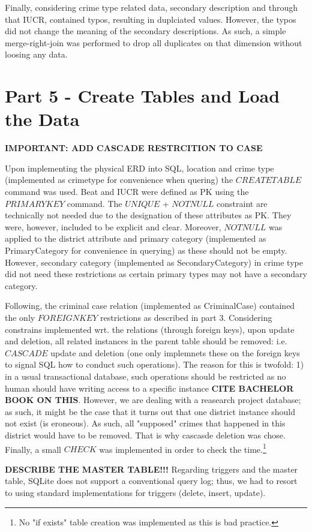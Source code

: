 \documentclass[a4paper]{article}
\begin{document}
Finally, considering crime type related data, secondary description and through that IUCR, contained typos, resulting in duplciated values. However, the typos did not change the meaning of the secondary descriptions. As such, a simple merge-right-join was performed to drop all duplicates on that dimension without loosing any data.

\section{Part 5 - Create Tables and Load the Data}
\textbf{IMPORTANT: ADD CASCADE RESTRCITION TO CASE}

Upon implementing the physical ERD into SQL, location and crime type (implemented as crimetype for convenience when quering) the $CREATE TABLE$ command was used. Beat and IUCR were defined as PK using the $PRIMARY KEY$ command. The $UNIQUE$ + $NOT NULL$ constraint are technically not needed due to the designation of these attributes as PK. They were, however, included to be explicit and clear. Moreover, $NOT NULL$ was applied to the district attribute and primary category (implemented as PrimaryCategory for convenience in querying) as these should not be empty. However, secondary category (implemented as SecondaryCategory) in crime type did not need these restrictions as certain primary types may not have a secondary category.

Following, the criminal case relation (implemented as CriminalCase) contained the only $FOREIGN KEY$ restrictions as described in part 3. Considering constrains implemented wrt. the relations (through foreign keys), upon update and deletion, all related instances in the parent table should be removed: i.e. $CASCADE$ update and deletion (one only implemnets these on the foreign keys to signal SQL how to conduct such operations). The reason for this is twofold: 1) in a usual transactional database, such operations should be restricted as no human should have writing access to a specific instance \textbf{CITE BACHELOR BOOK ON THIS}. However, we are dealing with a reasearch project database; as such, it might be the case that it turns out that one district instance should not exist (is eroneous). As such, all "supposed" crimes that happened in this district would have to be removed. That is why cascasde deletion was chose. Finally, a small $CHECK$ was implemented in order to check the time.\footnote{No "if exists" table creation was implemented as this is bad practice.}


\textbf{DESCRIBE THE MASTER TABLE!!!}
Regarding triggers and the master table, SQLite does not support a conventional query log; thus, we had to resort to using standard implementations for triggers (delete, insert, update). 
\end{document}
